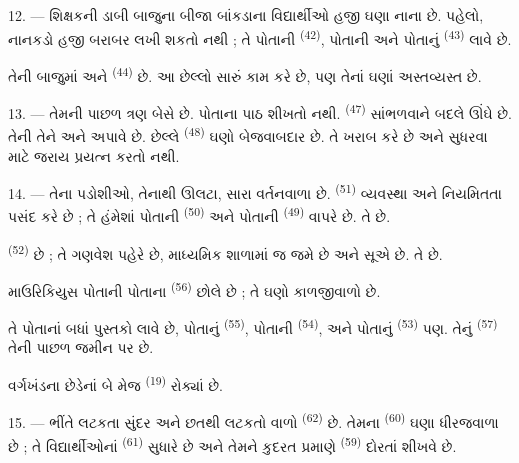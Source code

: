 12. --- શિક્ષકની ડાબી બાજુના બીજા બાંકડાના વિદ્યાર્થીઓ હજી ઘણા નાના
છે. પહેલો, નાનકડો  હજી બરાબર લખી શકતો નથી ; તે
પોતાની  \textsuperscript{(42)}, પોતાની 
અને પોતાનું  \textsuperscript{(43)} લાવે છે.

તેની બાજુમાં  અને 
\textsuperscript{(44)} છે. આ છેલ્લો સારું કામ કરે છે, પણ તેનાં
 ઘણાં અસ્તવ્યસ્ત છે.

13. --- તેમની પાછળ ત્રણ  બેસે છે. 
પોતાના પાઠ શીખતો નથી.  \textsuperscript{(47)}
સાંભળવાને બદલે ઊંઘે છે. તેની  તેને  અને
 અપાવે છે. છેલ્લે 
\textsuperscript{(48)} ઘણો બેજવાબદાર છે. તે ખરાબ  કરે છે
અને સુધરવા માટે જરાય પ્રયત્ન કરતો નથી.

14. --- તેના પડોશીઓ, તેનાથી ઊલટા, સારા વર્તનવાળા છે.
 \textsuperscript{(51)} વ્યવસ્થા અને નિયમિતતા પસંદ
કરે છે ; તે હંમેશાં પોતાની  \textsuperscript{(50)}
અને પોતાની  \textsuperscript{(49)} વાપરે છે. તે
 છે.

 \textsuperscript{(52)}  છે ; તે ગણવેશ પહેરે છે, માધ્યમિક શાળામાં જ જમે છે અને સૂએ
છે. તે  છે.

માઉરિકિયુસ પોતાની  પોતાના 
\textsuperscript{(56)} છોલે છે ; તે ઘણો કાળજીવાળો છે.

તે પોતાનાં બધાં પુસ્તકો લાવે છે, પોતાનું 
\textsuperscript{(55)}, પોતાની  \textsuperscript{(54)},
અને પોતાનું  \textsuperscript{(53)} પણ. તેનું
 \textsuperscript{(57)} તેની પાછળ જમીન પર છે.

વર્ગખંડના છેડેનાં બે મેજ 
\textsuperscript{(19)} રોક્યાં છે.

\VUsaut{4.6mm}
\VUsaut{3.4mm}

15. ---  ભીંતે લટકતા સુંદર  અને
છતથી લટકતો  વાળો  \textsuperscript{(62)} છે.
તેમના  \textsuperscript{(60)} ઘણા ધીરજવાળા છે ; તે
વિદ્યાર્થીઓનાં  \textsuperscript{(61)} સુધારે છે અને
તેમને કુદરત પ્રમાણે  \textsuperscript{(59)} દોરતાં
શીખવે છે.

